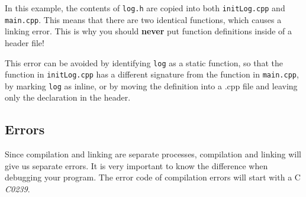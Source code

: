 \documentclass[english]{lni}
\begin{document}
In this example, the contents of \verb$log.h$ are copied into both \verb$initLog.cpp$
and \verb$main.cpp$. This means that there are two identical functions, which
causes a linking error. This is why you should \textbf{never} put function definitions inside
of a header file!

This error can be avoided by identifying \verb$log$ as a static function, so
that the function in \verb$initLog.cpp$ has a different signature from the function in
\verb$main.cpp$, by marking \verb$log$ as inline, or by moving the definition into a .cpp file
and leaving only the declaration in the header.

\subsection{Errors}
Since compilation and linking are separate processes, compilation and linking
will give us separate errors. It is very important to know the difference
when debugging your program. The error code of compilation errors will start
with a C \ie \emph{C0239}.
\end{document}
